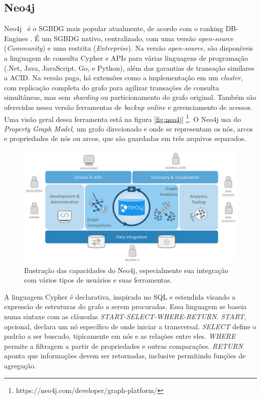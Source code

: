 \documentclass[conference]{IEEEtran}
\begin{document}
\subsection{Neo4j}

Neo4j~\cite{neo4j} é o SGBDG mais popular atualmente, de acordo com o ranking
DB-Engines \cite{db_engines}. É um SGBDG nativo, centralizado, com uma versão
\emph{open-source} (\emph{Community}) e uma restrita (\emph{Enterprise}). Na
versão \emph{open-source}, são disponíveis a linguagem de consulta Cypher e
APIs para várias linguagens de programação (.Net, Java, JavaScript, Go, e
Python), além das garantias de transação similares a ACID. Na versão paga, há
extensões como a implementação em um \emph{cluster}, com replicação completa
do grafo para agilizar transações de consulta simultâneas, mas sem
\emph{sharding} ou particionamento do grafo original. Também são oferecidas
nessa versão ferramentas de \emph{backup online} e gerenciamento de acessos.
Uma visão geral dessa ferramenta está na figura \ref{fig:neo4j}
\footnote{https://neo4j.com/developer/graph-platform/}. O Neo4j usa
do \emph{Property Graph Model}, um grafo direcionado e onde se representam os
nós, arcos e propriedades de nós ou arcos, que são guardadas em três arquivos
separados.

\begin{figure}[htbp]
\centerline{\includegraphics[width=0.9\linewidth]{neo4j/neo4j_graph_platform.jpg}}
\caption{Ilustração das capacidades do Neo4j, especialmente sua integração com
  vários tipos de usuários e suas ferramentas.}\label{fig:neo4j}
\label{fig}
\end{figure}

A linguagem Cypher é declarativa, inspirada no SQL e estendida visando a
expressão de estruturas do grafo a serem procuradas. Essa linguagem se baseia
numa sintaxe com as cláusulas \emph{START-SELECT-WHERE-RETURN}. \emph{START},
opcional, declara um nó específico de onde iniciar a transversal. \emph{SELECT}
define o padrão a ser buscado, tipicamente em nós e as relações entre eles.
\emph{WHERE} permite a filtragem a partir de propriedades e outras comparações.
\emph{RETURN} aponta que informações devem ser retornadas, inclusive permitindo
funções de agregação.
\end{document}

